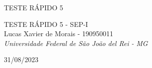 \begin{center}
TESTE RÁPIDO 5\vfill

TESTE RÁPIDO 5 - SEP-I\\
Lucas Xavier de Morais - 190950011\\
\textit{Universidade Federal de São João del Rei - MG}\vfill

31/08/2023
\end{center}
\newpage